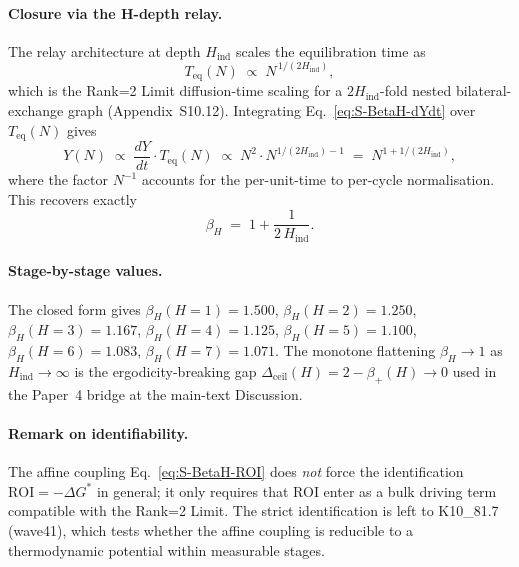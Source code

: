 \documentclass[11pt]{article}
\begin{document}
\paragraph{Closure via the H-depth relay.} The relay architecture at depth $H_{\mathrm{ind}}$ scales the equilibration time as
\begin{equation}
T_{\mathrm{eq}}(N) \;\propto\; N^{\,1/(2 H_{\mathrm{ind}})},
\label{eq:S-BetaH-Teq}
\end{equation}
which is the Rank=2 Limit diffusion-time scaling for a $2H_{\mathrm{ind}}$-fold nested bilateral-exchange graph (Appendix~S10.12).  Integrating Eq.~\eqref{eq:S-BetaH-dYdt} over $T_{\mathrm{eq}}(N)$ gives
\begin{equation}
Y(N) \;\propto\; \frac{dY}{dt}\cdot T_{\mathrm{eq}}(N) \;\propto\; N^{2}\cdot N^{1/(2 H_{\mathrm{ind}})-1} \;=\; N^{1+1/(2 H_{\mathrm{ind}})},
\end{equation}
where the factor $N^{-1}$ accounts for the per-unit-time to per-cycle normalisation.  This recovers exactly
\begin{equation}
\boxed{\beta_H \;=\; 1 + \frac{1}{2\,H_{\mathrm{ind}}}}.
\label{eq:S-BetaH-boxed}
\end{equation}

\paragraph{Stage-by-stage values.} The closed form gives $\beta_H(H{=}1)=1.500$, $\beta_H(H{=}2)=1.250$, $\beta_H(H{=}3)=1.167$, $\beta_H(H{=}4)=1.125$, $\beta_H(H{=}5)=1.100$, $\beta_H(H{=}6)=1.083$, $\beta_H(H{=}7)=1.071$.  The monotone flattening $\beta_H\to 1$ as $H_{\mathrm{ind}}\to\infty$ is the ergodicity-breaking gap $\Delta_{\mathrm{ceil}}(H)=2-\beta_+(H)\to 0$ used in the Paper~4 bridge at the main-text Discussion.

\paragraph{Remark on identifiability.} The affine coupling Eq.~\eqref{eq:S-BetaH-ROI} does \emph{not} force the identification $\mathrm{ROI}=-\Delta G^*$ in general; it only requires that ROI enter as a bulk driving term compatible with the Rank=2 Limit.  The strict identification is left to K10\_81.7 (wave41), which tests whether the affine coupling is reducible to a thermodynamic potential within measurable stages.

\end{document}
